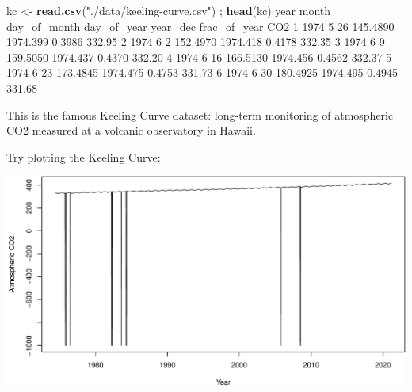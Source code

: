 \documentclass[
]{book}
\newenvironment{Shaded}{\begin{snugshade}}{\end{snugshade}}
\newcommand{\DataTypeTok}[1]{\textcolor[rgb]{0.13,0.29,0.53}{#1}}
\newcommand{\DecValTok}[1]{\textcolor[rgb]{0.00,0.00,0.81}{#1}}
\newcommand{\FloatTok}[1]{\textcolor[rgb]{0.00,0.00,0.81}{#1}}
\newcommand{\KeywordTok}[1]{\textcolor[rgb]{0.13,0.29,0.53}{\textbf{#1}}}
\newcommand{\NormalTok}[1]{#1}
\newcommand{\OperatorTok}[1]{\textcolor[rgb]{0.81,0.36,0.00}{\textbf{#1}}}
\newcommand{\StringTok}[1]{\textcolor[rgb]{0.31,0.60,0.02}{#1}}
\begin{document}
\begin{Shaded}
\begin{Highlighting}[]
\NormalTok{kc <-}\StringTok{ }\KeywordTok{read.csv}\NormalTok{(}\StringTok{"./data/keeling-curve.csv"}\NormalTok{) ; }\KeywordTok{head}\NormalTok{(kc)}
\NormalTok{  year month day_of_month day_of_year year_dec frac_of_year    CO2}
\DecValTok{1} \DecValTok{1974}     \DecValTok{5}           \DecValTok{26}    \FloatTok{145.4890} \FloatTok{1974.399}       \FloatTok{0.3986} \FloatTok{332.95}
\DecValTok{2} \DecValTok{1974}     \DecValTok{6}            \DecValTok{2}    \FloatTok{152.4970} \FloatTok{1974.418}       \FloatTok{0.4178} \FloatTok{332.35}
\DecValTok{3} \DecValTok{1974}     \DecValTok{6}            \DecValTok{9}    \FloatTok{159.5050} \FloatTok{1974.437}       \FloatTok{0.4370} \FloatTok{332.20}
\DecValTok{4} \DecValTok{1974}     \DecValTok{6}           \DecValTok{16}    \FloatTok{166.5130} \FloatTok{1974.456}       \FloatTok{0.4562} \FloatTok{332.37}
\DecValTok{5} \DecValTok{1974}     \DecValTok{6}           \DecValTok{23}    \FloatTok{173.4845} \FloatTok{1974.475}       \FloatTok{0.4753} \FloatTok{331.73}
\DecValTok{6} \DecValTok{1974}     \DecValTok{6}           \DecValTok{30}    \FloatTok{180.4925} \FloatTok{1974.495}       \FloatTok{0.4945} \FloatTok{331.68}
\end{Highlighting}
\end{Shaded}

This is the famous Keeling Curve dataset: long-term monitoring of atmospheric CO2 measured at a volcanic observatory in Hawaii.

Try plotting the Keeling Curve:

\begin{Shaded}
\end{Shaded}

\includegraphics{figures/unnamed-chunk-482-1.pdf}
\end{document}
